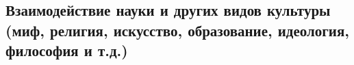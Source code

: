 
\subsection[Взаимодействие науки и других видов культуры]{Взаимодействие науки и других видов культуры (миф, религия, искусство,
образование, идеология, философия и т.д.)}

